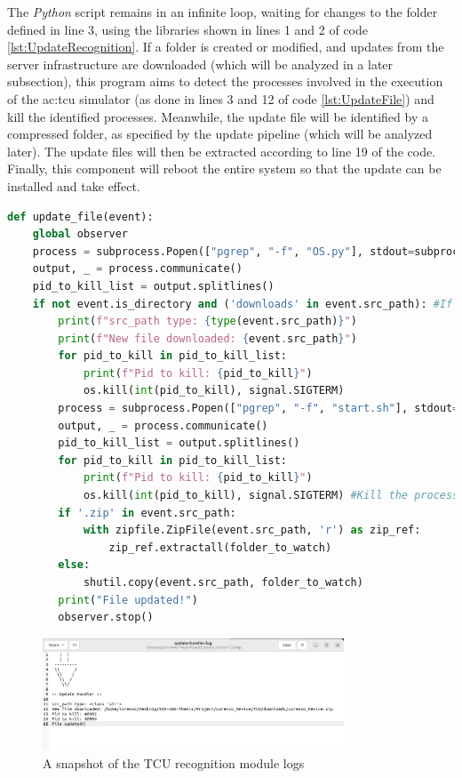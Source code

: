 The \textit{Python} script remains in an infinite loop, waiting for changes to the folder defined in line 3, using the libraries shown in lines 1 and 2 of code \ref{lst:UpdateRecognition}.
If a folder is created or modified, and updates from the server infrastructure are downloaded (which will be analyzed in a later subsection), this program aims to detect the processes involved in the execution of the \gls{ac:tcu} simulator (as done in lines 3 and 12 of code \ref{lst:UpdateFile}) and kill the identified processes. Meanwhile, the update file will be identified by a compressed folder, as specified by the update pipeline (which will be analyzed later). The update files will then be extracted according to line 19 of the code. Finally, this component will reboot the entire system so that the update can be installed and take effect.
\begin{lstlisting}[language=Python, caption={Code for performing actions when the designated download folder is changed}, label=lst:UpdateFile]
def update_file(event):
    global observer
    process = subprocess.Popen(["pgrep", "-f", "OS.py"], stdout=subprocess.PIPE, text=True)
    output, _ = process.communicate()
    pid_to_kill_list = output.splitlines()
    if not event.is_directory and ('downloads' in event.src_path): #If the new item is a directory
        print(f"src_path type: {type(event.src_path)}")
        print(f"New file downloaded: {event.src_path}")
        for pid_to_kill in pid_to_kill_list:
            print(f"Pid to kill: {pid_to_kill}")
            os.kill(int(pid_to_kill), signal.SIGTERM)    
        process = subprocess.Popen(["pgrep", "-f", "start.sh"], stdout=subprocess.PIPE, text=True)
        output, _ = process.communicate()
        pid_to_kill_list = output.splitlines()
        for pid_to_kill in pid_to_kill_list:
            print(f"Pid to kill: {pid_to_kill}")
            os.kill(int(pid_to_kill), signal.SIGTERM) #Kill the process
        if '.zip' in event.src_path:
            with zipfile.ZipFile(event.src_path, 'r') as zip_ref:
                zip_ref.extractall(folder_to_watch)
        else:
            shutil.copy(event.src_path, folder_to_watch)          
        print("File updated!")
        observer.stop()
\end{lstlisting}

\begin{figure}[h]  %
    \centering
    \includegraphics[width=0.8\textwidth]{images/watchdog_log.png}  %
    \caption{A snapshot of the TCU recognition module logs}
    \label{fig:Watchdog_log}
\end{figure}


